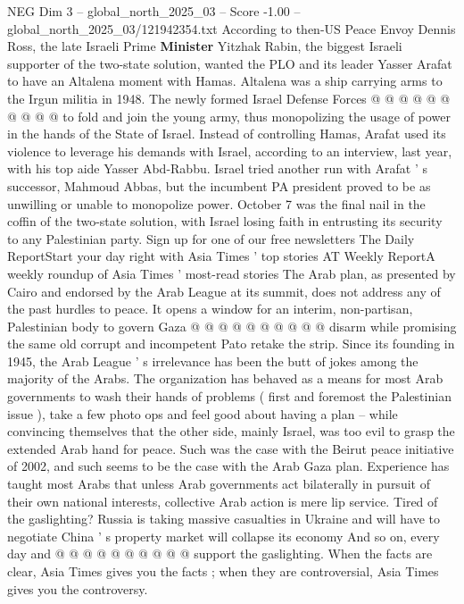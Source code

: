 \begin{textsample}{NEG Dim 3 – global\_north\_2025\_03 – Score -1.00 – global\_north\_2025\_03/121942354.txt}
According to then-US Peace Envoy Dennis Ross, the late Israeli Prime \textbf{Minister} Yitzhak Rabin, the biggest Israeli supporter of the two-state solution, wanted the PLO and its leader Yasser Arafat to have an Altalena moment with Hamas.
Altalena was a ship carrying arms to the Irgun militia in 1948.
The newly formed Israel Defense Forces @ @ @ @ @ @ @ @ @ @ to fold and join the young army, thus monopolizing the usage of power in the hands of the State of Israel.
Instead of controlling Hamas, Arafat used its violence to leverage his demands with Israel, according to an interview, last year, with his top aide Yasser Abd-Rabbu.
Israel tried another run with Arafat ' s successor, Mahmoud Abbas, but the incumbent PA president proved to be as unwilling or unable to monopolize power.
October 7 was the final nail in the coffin of the two-state solution, with Israel losing faith in entrusting its security to any Palestinian party.
Sign up for one of our free newsletters The Daily ReportStart your day right with Asia Times ' top stories AT Weekly ReportA weekly roundup of Asia Times ' most-read stories The Arab plan, as presented by Cairo and endorsed by the Arab League at its summit, does not address any of the past hurdles to peace.
It opens a window for an interim, non-partisan, Palestinian body to govern Gaza @ @ @ @ @ @ @ @ @ @ disarm while promising the same old corrupt and incompetent Pato retake the strip.
Since its founding in 1945, the Arab League ' s irrelevance has been the butt of jokes among the majority of the Arabs.
The organization has behaved as a means for most Arab governments to wash their hands of problems ( first and foremost the Palestinian issue ), take a few photo ops and feel good about having a plan -- while convincing themselves that the other side, mainly Israel, was too evil to grasp the extended Arab hand for peace.
Such was the case with the Beirut peace initiative of 2002, and such seems to be the case with the Arab Gaza plan.
Experience has taught most Arabs that unless Arab governments act bilaterally in pursuit of their own national interests, collective Arab action is mere lip service.
Tired of the gaslighting?
Russia is taking massive casualties in Ukraine and will have to negotiate China ' s property market will collapse its economy And so on, every day and @ @ @ @ @ @ @ @ @ @ support the gaslighting.
When the facts are clear, Asia Times gives you the facts ; when they are controversial, Asia Times gives you the controversy.

\end{textsample}
